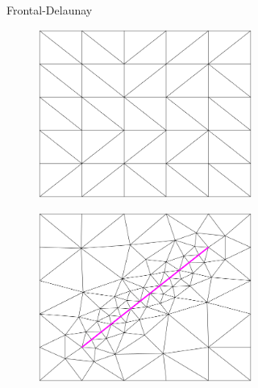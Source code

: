 \begin{figure}[p]
\begin{subfigure}[b]{\textwidth}
\begin{subfigure}[b]{0.32\textwidth}
        \end{subfigure}
        \caption{Frontal-Delaunay}
        \label{fig:Gmsh-Frontal-Delaunay}
    \end{subfigure}
    \begin{subfigure}[b]{\textwidth}
        \centering
        \begin{subfigure}[b]{0.32\textwidth}
            \centering
            \includegraphics[width=\textwidth]{report/Images/Software/Gmsh meshing algorithms/gmsh_meshing_algorithms_delquad.png}
        \end{subfigure}
        \begin{subfigure}[b]{0.32\textwidth}
            \centering
            \includegraphics[width=\textwidth]{report/Images/Software/Gmsh meshing algorithms/gmsh_meshing_algorithms_embedded_delquad.png}

\end{subfigure}
\end{subfigure}
\end{figure}
